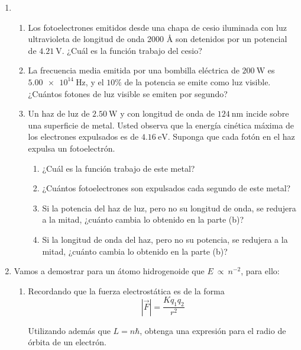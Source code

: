 \documentclass[letterpaper,11pt]{article}
\begin{document}
\begin{enumerate}\setlength{\itemsep}{0.4cm}

\item
\begin{enumerate}
    \item Los fotoelectrones emitidos desde una chapa de cesio iluminada con luz ultravioleta de longitud de onda 2000 {\AA} son detenidos por un potencial de $\SI{4.21}{\V}$. ¿Cuál es la función trabajo del cesio?

    \item La frecuencia media emitida por una bombilla eléctrica de $\SI{200}{\W}$ es $\SI{5.00e14}{\Hz}$, y el $10\%$ de la potencia se emite como luz visible. ¿Cuántos fotones de luz visible se emiten por segundo?
    
    \item Un haz de luz de $\SI{2.50}{\W}$ y con longitud de onda de $\SI{124}{\nm}$ incide sobre una superficie de metal. Usted observa que la energía cinética máxima de los electrones expulsados es de $\SI{4.16}{\eV}$. Suponga que cada fotón en el haz expulsa un fotoelectrón.
    
        \begin{enumerate}
            \item ¿Cuál es la función trabajo de este metal?
            
            \item ¿Cuántos fotoelectrones son expulsados cada segundo de este metal?
            
            \item Si la potencia del haz de luz, pero no su longitud de onda, se redujera a la mitad, ¿cuánto cambia lo obtenido en la parte (b)?
            
            \item Si la longitud de onda del haz, pero no su potencia, se redujera a la mitad, ¿cuánto cambia lo obtenido en la parte (b)?
        \end{enumerate}
\end{enumerate}


\item Vamos a demostrar para un átomo hidrogenoide que $E~\propto~n^{-2}$, para ello:
\begin{enumerate}
    \item Recordando que la fuerza electrostática es de la forma
    $$\left|{\vec{F}}\right| = \frac{K q_1 q_2}{r^2} $$
    
    Utilizando además que $L = n\hbar$, obtenga una expresión para el radio de órbita de un electrón.
    

\end{enumerate}
\end{enumerate}
\end{document}
